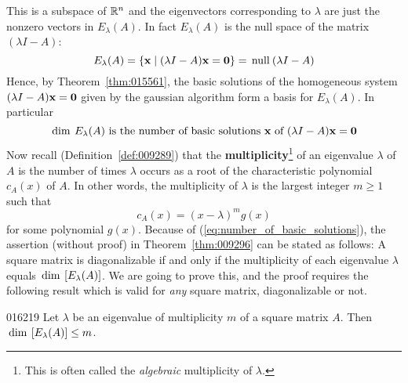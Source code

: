 \noindent This is a subspace of $\mathbb{R}^n$ and the eigenvectors
corresponding to $\lambda$ are just the nonzero vectors in
$E_{\lambda}(A)$. In fact $E_{\lambda}(A)$ is the null space of the matrix $(\lambda I - A)$:
\begin{equation*}
E_{\lambda}(A) = \{\textbf{x} \mid (\lambda I - A)\textbf{x} = \textbf{0} \} = \thinspace\operatorname{null\medspace}(\lambda I - A)
\end{equation*}
Hence, by Theorem~\ref{thm:015561}, the basic solutions of the
homogeneous system $(\lambda I - A)\textbf{x} = \textbf{0}$ given by the gaussian algorithm form a basis for $E_{\lambda}(A)$. In particular
\begin{equation}
\label{eq:number_of_basic_solutions}
\thinspace\operatorname{dim \medspace} E_\lambda(A) \mbox{ is the number of basic solutions }\textbf{x}\mbox{ of }
(\lambda I - A)\textbf{x} = \textbf{0}
\end{equation}
Now recall (Definition~\ref{def:009289}) that the \textbf{multiplicity}\footnote{This is often called the \textit{algebraic} multiplicity of $\lambda$.}
 of an eigenvalue $\lambda$ of $A$ is the number of times $\lambda$ occurs as a root of the characteristic polynomial $c_{A}(x)$ of $A$. In other words, the multiplicity of $\lambda$ is the largest integer $m \geq 1$ such that
\begin{equation*}
c_A(x) = (x - \lambda)^mg(x)
\end{equation*}
for some polynomial $g(x)$. Because of (\ref{eq:number_of_basic_solutions}), the assertion (without proof) in Theorem~\ref{thm:009296} can be stated as follows: A square matrix is diagonalizable if and only if the multiplicity of each eigenvalue $\lambda$ equals $\thinspace\operatorname{dim\medspace}\left[ E_{\lambda}(A)\right]$. We are going to prove this, and the proof requires the following result which is valid for \textit{any} square matrix, diagonalizable or not.

\begin{lemma}{}{016219}
Let $\lambda$ be an eigenvalue of multiplicity $m$ of a square matrix
$A$. Then $\thinspace\operatorname{dim\medspace}\left[ E_{\lambda}(A)\right] \leq m$.
\end{lemma}

